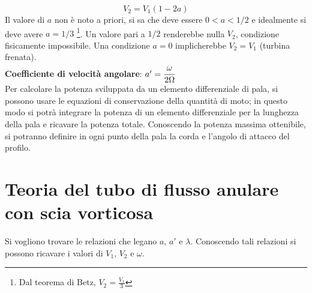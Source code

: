 \begin{equation}\label{eq:v2}
\boxed{V_2 = V_1 (1-2a)}
\end{equation}
Il valore di $a$ non è noto a priori, si sa che deve essere $0 < a < 1/2$ e idealmente si deve avere $a = 1/3$ \footnote{Dal teorema di Betz, $V_2=\frac{V_1}{3}$}. Un valore pari a $1/2$ renderebbe nulla $V_2$, condizione fisicamente impossibile. Una condizione $a=0$ implicherebbe $V_2 = V_1$ (turbina frenata).\\
\textbf{Coefficiente di velocità angolare}: $a' = \cfrac{\omega}{2 \Omega}$\\

Per calcolare la potenza sviluppata da un elemento differenziale di pala, si possono usare le equazioni di conservazione della quantità di moto; in questo modo si potrà integrare la potenza di un elemento differenziale per la lunghezza della pala e ricavare la potenza totale. Conoscendo la potenza massima ottenibile, si potranno definire in ogni punto della pala la corda e l'angolo di attacco del profilo.

\section{Teoria del tubo di flusso anulare con scia vorticosa}
Si vogliono trovare le relazioni che legano $a$, $a'$ e $\lambda$. Conoscendo tali relazioni si possono ricavare i valori di $V_1$, $V_2$ e $\omega$.

